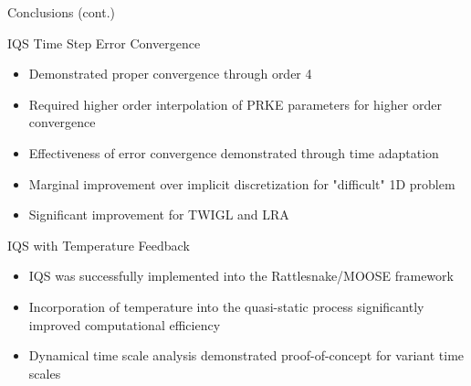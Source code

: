 \documentclass[8pt,xcolor=dvipnames]{beamer}
\begin{document}
\begin{frame}{Conclusions (cont.)}

\begin{block}{IQS Time Step Error Convergence}
\begin{itemize}
\item Demonstrated proper convergence through order 4
\item Required higher order interpolation of PRKE parameters for higher order convergence
\item Effectiveness of error convergence demonstrated through time adaptation
\item Marginal improvement over implicit discretization for "difficult" 1D problem
\item Significant improvement for TWIGL and LRA
\end{itemize}
\end{block}

\begin{block}{IQS with Temperature Feedback}
\begin{itemize}
\item IQS was successfully implemented into the Rattlesnake/MOOSE framework
\item Incorporation of temperature into the quasi-static process significantly improved computational efficiency
\item Dynamical time scale analysis demonstrated proof-of-concept for variant time scales
\end{itemize}
\end{block}

\end{frame}
\end{document}
